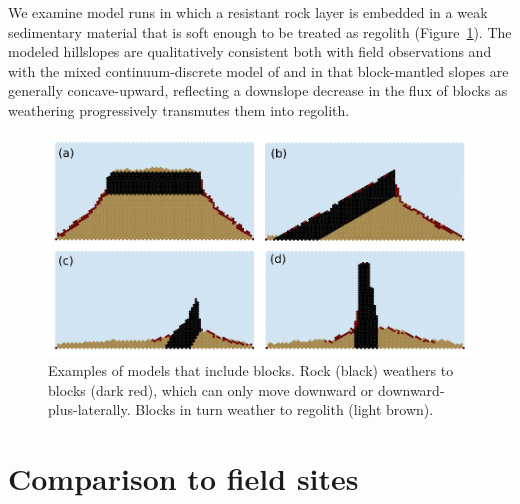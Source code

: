 \documentclass[esurf, manuscript]{copernicus}
\begin{document}
We examine model runs in which a resistant rock layer is embedded in a weak sedimentary material that is soft enough to be treated as regolith (Figure~\ref{blocks}). The modeled hillslopes are qualitatively consistent both with field observations and with the mixed continuum-discrete model of \citet{glade2017block} and \citet{glade2017quasi} in that block-mantled slopes are generally concave-upward, reflecting a downslope decrease in the flux of blocks as weathering progressively transmutes them into regolith.

 
\begin{figure}[t]
\includegraphics{Figures/block_runs.pdf}
\caption{Examples of models that include blocks. Rock (black) weathers to blocks (dark red), which can only move downward or downward-plus-laterally. Blocks in turn weather to regolith (light brown).}
\label{blocks}
\end{figure}


\section{Comparison to field sites}
% 
% 
% 
%
\end{document}
